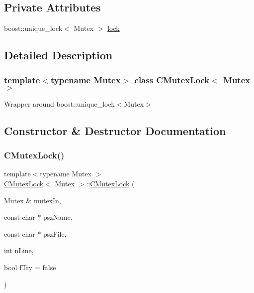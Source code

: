 \subsection*{Private Attributes}
\begin{DoxyCompactItemize}
\item 
boost\+::unique\+\_\+lock$<$ Mutex $>$ \mbox{\hyperlink{class_c_mutex_lock_a2f3b4666271388be42da0198ba717744}{lock}}
\end{DoxyCompactItemize}


\subsection{Detailed Description}
\subsubsection*{template$<$typename Mutex$>$\newline
class C\+Mutex\+Lock$<$ Mutex $>$}

Wrapper around boost\+::unique\+\_\+lock$<$\+Mutex$>$ 

\subsection{Constructor \& Destructor Documentation}
\mbox{\label{class_c_mutex_lock_a5de553653dbbcc1432d07658fa9b0e8b}} 
\subsubsection{\texorpdfstring{C\+Mutex\+Lock()}{CMutexLock()}\hspace{0.1cm}{\footnotesize\ttfamily [1/2]}}
{\footnotesize\ttfamily template$<$typename Mutex $>$ \\
\mbox{\hyperlink{class_c_mutex_lock}{C\+Mutex\+Lock}}$<$ Mutex $>$\+::\mbox{\hyperlink{class_c_mutex_lock}{C\+Mutex\+Lock}} (\begin{DoxyParamCaption}\item[{Mutex \&}]{mutex\+In,  }\item[{const char $\ast$}]{psz\+Name,  }\item[{const char $\ast$}]{psz\+File,  }\item[{int}]{n\+Line,  }\item[{bool}]{f\+Try = {\ttfamily false} }\end{DoxyParamCaption})\hspace{0.3cm}{\ttfamily [inline]}}

